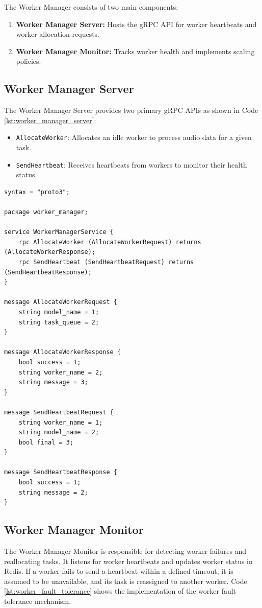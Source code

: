 The Worker Manager consists of two main components:
\begin{enumerate}
    \item \textbf{Worker Manager Server:} Hosts the gRPC API for worker heartbeats and worker allocation requests.
    \item \textbf{Worker Manager Monitor:} Tracks worker health and implements scaling policies.
\end{enumerate}

\subsection{Worker Manager Server}
The Worker Manager Server provides two primary gRPC APIs as shown in  Code \ref{lst:worker_manager_server}:
\begin{itemize}
    \item \texttt{AllocateWorker}: Allocates an idle worker to process audio data for a given task.
    \item \texttt{SendHeartbeat}: Receives heartbeats from workers to monitor their health status.
\end{itemize}

\begin{lstlisting}[language=Proto3, caption={Worker Manager Server gRPC Proto File}, label={lst:worker_manager_server}]
syntax = "proto3";

package worker_manager;

service WorkerManagerService {
    rpc AllocateWorker (AllocateWorkerRequest) returns (AllocateWorkerResponse);
    rpc SendHeartbeat (SendHeartbeatRequest) returns (SendHeartbeatResponse);
}

message AllocateWorkerRequest {
    string model_name = 1;
    string task_queue = 2;
}

message AllocateWorkerResponse {
    bool success = 1;
    string worker_name = 2;
    string message = 3;
}

message SendHeartbeatRequest {
    string worker_name = 1;
    string model_name = 2;
    bool final = 3;
}

message SendHeartbeatResponse {
    bool success = 1;
    string message = 2;
}
\end{lstlisting}    

\subsection{Worker Manager Monitor}
The Worker Manager Monitor is responsible for detecting worker failures and reallocating tasks. It listens for worker heartbeats and updates worker status in Redis. If a worker fails to send a heartbeat within a defined timeout, it is assumed to be unavailable, and its task is reassigned to another worker. Code \ref{lst:worker_fault_tolerance} shows the implementation of the worker fault tolerance mechanism.

